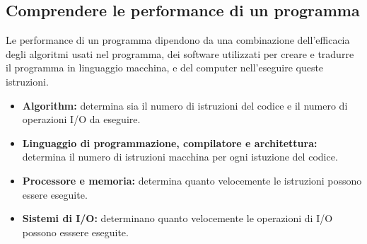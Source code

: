\documentclass[12pt,a4paper]{article}
\begin{document}
\subsection{Comprendere le performance di un programma}
Le performance di un programma dipendono da una combinazione dell'efficacia degli algoritmi usati nel programma, dei software utilizzati per creare e tradurre il programma in linguaggio macchina, e  del computer nell'eseguire queste istruzioni.
\begin{itemize}
	\item {\bfseries Algorithm:} determina sia il numero di istruzioni del codice e il numero di operazioni I/O da eseguire.
	\item {\bfseries Linguaggio di programmazione, compilatore e architettura:} determina il numero di istruzioni macchina per ogni istuzione del codice.
	\item {\bfseries Processore e memoria:} determina quanto velocemente le istruzioni possono essere eseguite.
	\item {\bfseries Sistemi di I/O:} determinano quanto velocemente le operazioni di I/O possono esssere eseguite.
\end{itemize}
\end{document}
